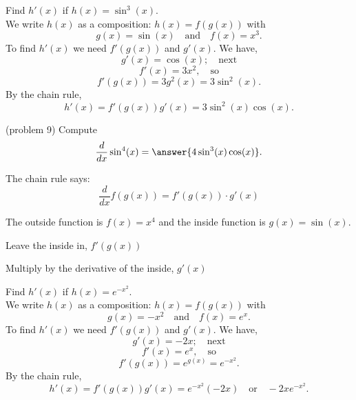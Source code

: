 \documentclass[handout]{ximera}
\begin{document}
\begin{example}[example 9]
Find $h'(x)$ if $h(x) = \sin^3(x)$.\\
We write $h(x)$ as a composition: $h(x)=f(g(x))$ with 
\[g(x) =\sin(x)   \quad \text{and} \quad  f(x) = x^3.\]
 To find $h'(x)$ we need $f'(g(x))$ and $g'(x)$.  We have, 
\[g'(x) =\cos(x); \quad \text{next} \] 
\[f'(x) = 3x^2, \quad \text{so}\] 
\[f'(g(x)) = 3g^2(x) = 3\sin^2(x).\]
By the chain rule,
\[h'(x) = f'(g(x))g'(x) =  3\sin^2(x)\cos(x).\]
\end{example}

\begin{center}
\begin{foldable}
\end{foldable}
\end{center}
 


\begin{problem}(problem 9)
  Compute
  \[
  \frac{d}{dx} \sin^4(x) = \answer{4\sin^3(x)\cos(x)}.
  \]
  
    \begin{hint}
      The chain rule says:
      \[
      \frac{d}{dx} f(g(x)) = f'(g(x))\cdot g'(x)
      \]
    \end{hint}
    \begin{hint}
      The outside function is $f(x) = x^4$ and the inside
      function is $g(x) = \sin(x)$.
    \end{hint}
    \begin{hint}
		  Leave the inside in, $f'(g(x))$
		\end{hint}
		\begin{hint}
		  Multiply by the derivative of the inside, $g'(x)$
		\end{hint}
    
\end{problem}



\begin{example}[example 10]
Find $h'(x)$ if $h(x) = e^{-x^2}$.\\
We write $h(x)$ as a composition: $h(x)=f(g(x))$ with 
\[g(x) = -x^2  \quad \text{and} \quad  f(x) =e^x.\]
 To find $h'(x)$ we need $f'(g(x))$ and $g'(x)$. We have, 
\[g'(x) = -2x; \quad \text{next} \] 
\[f'(x) = e^x, \quad \text{so} \]
\[f'(g(x)) = e^{g(x)} = e^{-x^2}.\]
By the chain rule,
\[h'(x) = f'(g(x))g'(x) = e^{-x^2} (-2x) \quad \text{or} \quad -2xe^{-x^2}.\]
\end{example}
\end{document}
